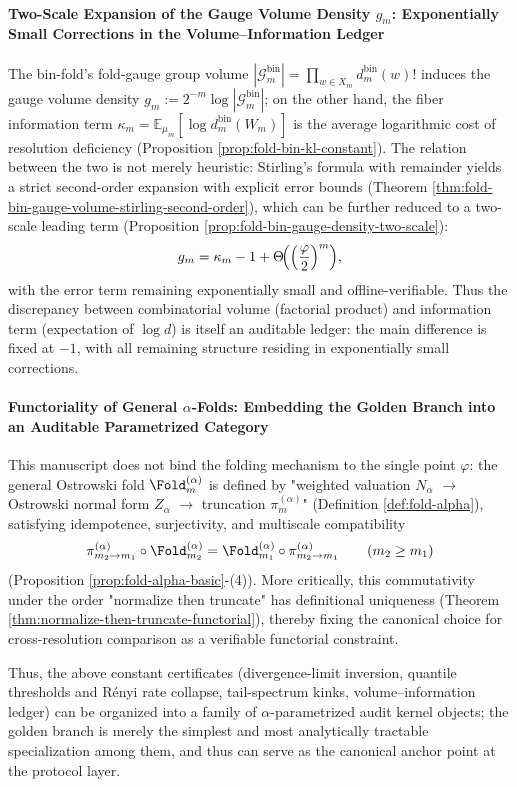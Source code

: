\paragraph{Two-Scale Expansion of the Gauge Volume Density \texorpdfstring{$g_m$}{gm}: Exponentially Small Corrections in the Volume–Information Ledger}
The bin-fold's fold-gauge group volume
\(
|\mathcal{G}^{\mathrm{bin}}_m|=\prod_{w\in X_m}d_m^{\mathrm{bin}}(w)!
\)
induces the gauge volume density \(g_m:=2^{-m}\log|\mathcal{G}^{\mathrm{bin}}_m|\);
on the other hand, the fiber information term
\(
\kappa_m=\mathbb{E}_{\mu_m}[\log d_m^{\mathrm{bin}}(W_m)]
\)
is the average logarithmic cost of resolution deficiency (Proposition \ref{prop:fold-bin-kl-constant}).
The relation between the two is not merely heuristic: Stirling's formula with remainder yields a strict second-order expansion with explicit error bounds (Theorem \ref{thm:fold-bin-gauge-volume-stirling-second-order}), which can be further reduced to a two-scale leading term (Proposition \ref{prop:fold-bin-gauge-density-two-scale}):
\[
g_m=\kappa_m-1+\Theta\!\Bigl(\Bigl(\frac{\varphi}{2}\Bigr)^m\Bigr),
\]
with the error term remaining exponentially small and offline-verifiable.
Thus the discrepancy between combinatorial volume (factorial product) and information term (expectation of \(\log d\)) is itself an auditable ledger: the main difference is fixed at \(-1\), with all remaining structure residing in exponentially small corrections.

\paragraph{Functoriality of General \texorpdfstring{$\alpha$}{alpha}-Folds: Embedding the Golden Branch into an Auditable Parametrized Category}
This manuscript does not bind the folding mechanism to the single point \(\varphi\): the general Ostrowski fold
\(\Fold_m^{(\alpha)}\)
is defined by "weighted valuation \(N_\alpha\) \(\to\) Ostrowski normal form \(Z_\alpha\) \(\to\) truncation \(\pi_m^{(\alpha)}\)" (Definition \ref{def:fold-alpha}), satisfying idempotence, surjectivity, and multiscale compatibility
\[
\pi^{(\alpha)}_{m_2\to m_1}\circ \Fold^{(\alpha)}_{m_2}
=\Fold^{(\alpha)}_{m_1}\circ \pi^{(\alpha)}_{m_2\to m_1}
\qquad(m_2\ge m_1)
\]
(Proposition \ref{prop:fold-alpha-basic}-(4)).
More critically, this commutativity under the order "normalize then truncate" has definitional uniqueness (Theorem \ref{thm:normalize-then-truncate-functorial}), thereby fixing the canonical choice for cross-resolution comparison as a verifiable functorial constraint.
\par
Thus, the above constant certificates (divergence-limit inversion, quantile thresholds and R\'enyi rate collapse, tail-spectrum kinks, volume–information ledger) can be organized into a family of \(\alpha\)-parametrized audit kernel objects; the golden branch is merely the simplest and most analytically tractable specialization among them, and thus can serve as the canonical anchor point at the protocol layer.

